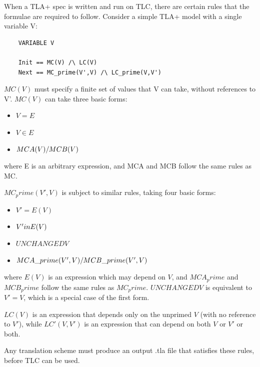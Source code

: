 When a TLA+ spec is written and run on TLC, there are certain rules that the formulae are required to follow. Consider a simple TLA+ model with a single variable V:

\begin{lstlisting}
	VARIABLE V

	Init == MC(V) /\ LC(V)
	Next == MC_prime(V',V) /\ LC_prime(V,V')

\end{lstlisting}

$MC(V)$ must specify a finite set of values that V can take, without references to V'. $MC(V)$ can take three basic forms:

\begin{itemize}
	\item $V = E$
	\item $V \in E$
	\item $MCA(V) \\/ MCB(V)$
\end{itemize}

where E is an arbitrary expression, and MCA and MCB follow the same rules as MC.

$MC_prime(V',V)$ is subject to similar rules, taking four basic forms:

\begin{itemize}
	\item $V' = E(V)$
	\item $V' \\ in E(V)$
	\item $UNCHANGED V$
	\item $MCA\_prime(V',V) \\/ MCB\_prime(V',V)$
\end{itemize}

where $E(V)$ is an expression which may depend on $V$, and $MCA_prime$ and $MCB_prime$ follow the same rules as $MC_prime$. $UNCHANGED V$ is equivalent to $V' = V$, which is a special case of the first form.

$LC(V)$ is an expression that depends only on the unprimed $V$ (with no reference to $V'$), while $LC'(V,V')$ is an expression that can depend on both $V$ or $V'$ or both.

Any translation scheme must produce an output .tla file that satisfies these rules, before TLC can be used.
